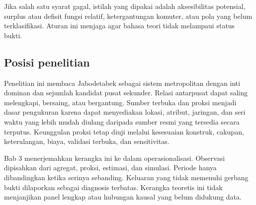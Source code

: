 \documentclass[11pt,a4paper,oneside,openany,indonesian]{report}
\begin{document}
Jika salah satu syarat gagal, istilah yang dipakai adalah aksesibilitas potensial, surplus atau defisit fungsi relatif, ketergantungan komuter, atau pola yang belum terklasifikasi. Aturan ini menjaga agar bahasa teori tidak melampaui status bukti.

\subsection{Posisi penelitian}

Penelitian ini membaca Jabodetabek sebagai sistem metropolitan dengan inti dominan dan sejumlah kandidat pusat sekunder. Relasi antarpusat dapat saling melengkapi, bersaing, atau bergantung. Sumber terbuka dan proksi menjadi dasar pengukuran karena dapat menyediakan lokasi, atribut, jaringan, dan seri waktu yang lebih mudah diulang daripada sumber resmi yang tersedia secara terputus. Keunggulan proksi tetap diuji melalui kesesuaian konstruk, cakupan, keterulangan, biaya, validasi terbuka, dan sensitivitas.

Bab 3 menerjemahkan kerangka ini ke dalam operasionalisasi. Observasi dipisahkan dari agregat, proksi, estimasi, dan simulasi. Periode hanya dibandingkan ketika serinya sebanding. Keluaran yang tidak memenuhi gerbang bukti dilaporkan sebagai diagnosis terbatas. Kerangka teoretis ini tidak menjanjikan panel lengkap atau hubungan kausal yang belum didukung data.

\printbibliography[title={Daftar Pustaka Bab 2}]
\end{document}
